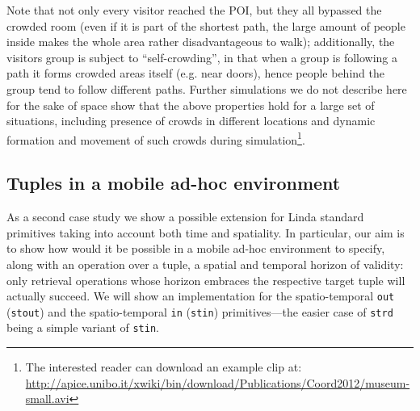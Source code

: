 \documentclass[12pt,a4paper,twoside,openright]{book}
\begin{document}
%
Note that not only every visitor reached the POI, but they all bypassed the crowded room (even if it is part of the shortest path, the large amount of people inside makes the whole area rather disadvantageous to walk); additionally, the visitors group is subject to ``self-crowding'', in that when a group is following a path it  forms crowded areas itself (e.g. near doors), hence people behind the group tend to follow different paths.
%
Further simulations we do not describe here for the sake of space show that the above properties hold for a large set of situations, including presence of crowds in different locations and dynamic formation and movement of such crowds during simulation\footnote{The interested reader can download an example clip at: {\url{http://apice.unibo.it/xwiki/bin/download/Publications/Coord2012/museum-small.avi}}}.

\subsection{Tuples in a mobile ad-hoc environment}

As a second case study we show a possible extension for Linda standard primitives taking into account both time and spatiality.
%
In particular, our aim is to show how would it be possible in a mobile ad-hoc environment to specify, along with an operation over a tuple, a spatial and temporal horizon of validity: only retrieval operations whose horizon embraces the respective target tuple will actually succeed.
%
We will show an implementation for the spatio-temporal \texttt{out} (\texttt{stout}) and the spatio-temporal \texttt{in} (\texttt{stin}) primitives---the easier case of \texttt{strd} being a simple variant of \texttt{stin}.
\end{document}
